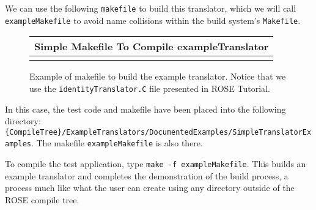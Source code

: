    We can use the following {\tt makefile} to build this translator, which we will call
{\tt exampleMakefile} to avoid name collisions within the build system's {\tt Makefile}.

{\indent
{\mySmallFontSize

\begin{latexonly}
%  
\begin{figure}[tb]
\begin{center}
\begin{tabular}{|c|} \hline
     Simple Makefile To Compile exampleTranslator
\\\hline\hline
   
\\\hline
\end{tabular}
\end{center}
\caption{ Example of makefile to build the example translator. Notice that we use the
    {\tt identityTranslator.C} file presented in ROSE Tutorial. }
\end{figure}
\end{latexonly}

\begin{htmlonly}
   
\end{htmlonly}

\label{usingRose:simpleTranslator}

}
}

   In this case, the test code and makefile have been placed into the following directory:
{\tt \{CompileTree\}/ExampleTranslators/DocumentedExamples/SimpleTranslatorExamples}.
The makefile {\tt exampleMakefile} is also there.


To compile the test application, type {\tt make -f exampleMakefile}.  This builds an 
example translator and completes the demonstration of the build process, a process 
much like what the user can create using any directory outside of the ROSE compile tree.

